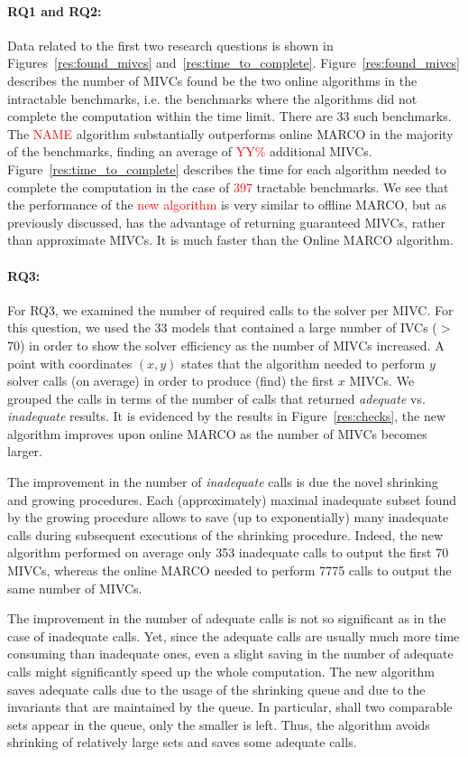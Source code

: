 \paragraph{RQ1 and RQ2:}
Data related to the first two research questions is shown in Figures~\ref{res:found_mivcs} and~\ref{res:time_to_complete}. 
Figure~\ref{res:found_mivcs} describes the number of MIVCs found be the two online algorithms in the intractable benchmarks, i.e. the benchmarks where the algorithms did not complete the computation within the time limit. There are 33 such benchmarks. 
The \textcolor{red}{NAME} algorithm substantially outperforms online MARCO in the majority of the benchmarks, finding an average of \textcolor{red}{YY\%} additional MIVCs. 
Figure~\ref{res:time_to_complete} describes the time for each algorithm needed to complete the computation in the case of \textcolor{red}{397} tractable benchmarks. We see that the performance of the \textcolor{red}{new algorithm} is very similar to offline MARCO, but as previously discussed, has the advantage of returning guaranteed MIVCs, rather than approximate MIVCs.  It is much faster than the Online MARCO algorithm.%

\vspace{-10pt}
\paragraph{RQ3:}  For RQ3, we examined the number of required calls to the solver per MIVC.  For this question, we used the 33 models that contained a large number of IVCs ($>$70) in order to show the solver efficiency as the number of MIVCs increased.  A point with coordinates $(x,y)$ states that the algorithm needed to perform $y$ solver calls (on average) in order to produce (find) the first $x$ MIVCs. We grouped the calls in terms of the number of calls that returned {\em adequate} vs. {\em inadequate} results.  It is evidenced by the results in Figure~\ref{res:checks}, the new algorithm improves upon online MARCO as the number of MIVCs becomes larger. 

The improvement in the number of \emph{inadequate} calls is due the novel shrinking and growing procedures. 
Each (approximately) maximal inadequate subset found by the growing procedure allows to save (up to exponentially) many inadequate calls during subsequent executions of the shrinking procedure.
Indeed, the new algorithm performed on average only 353 inadequate calls to output the first 70 MIVCs, whereas the online MARCO needed to perform 7775 calls to output the same number of MIVCs. 

The improvement in the number of adequate calls is not so significant as in the case of inadequate calls. Yet, since the adequate calls are usually much more time consuming than inadequate ones, even a slight saving in the number of adequate calls might significantly speed up the whole computation. The new algorithm saves adequate calls due to the usage of the shrinking queue and due to the invariants that are maintained by the queue. In particular, shall two comparable sets appear in the queue, only the smaller is left. Thus, the algorithm avoids shrinking of relatively large sets and saves some adequate calls.

